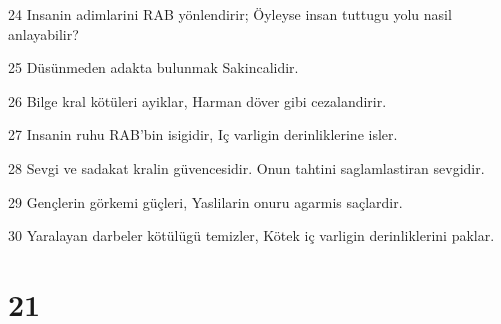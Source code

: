 \par 24 Insanin adimlarini RAB yönlendirir; Öyleyse insan tuttugu yolu nasil anlayabilir?
\par 25 Düsünmeden adakta bulunmak Sakincalidir.
\par 26 Bilge kral kötüleri ayiklar, Harman döver gibi cezalandirir.
\par 27 Insanin ruhu RAB'bin isigidir, Iç varligin derinliklerine isler.
\par 28 Sevgi ve sadakat kralin güvencesidir. Onun tahtini saglamlastiran sevgidir.
\par 29 Gençlerin görkemi güçleri, Yaslilarin onuru agarmis saçlardir.
\par 30 Yaralayan darbeler kötülügü temizler, Kötek iç varligin derinliklerini paklar.

\chapter{21}

